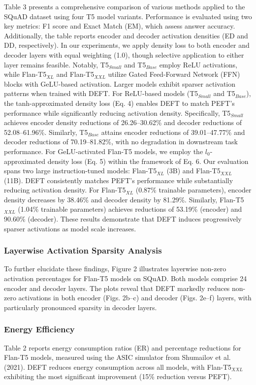 \documentclass[conference]{IEEEtran}
\begin{document}
Table 3 presents a comprehensive comparison of various methods applied to the SQuAD dataset using four T5 model variants. Performance is evaluated using two key metrics: F1 score and Exact Match (EM), which assess answer accuracy. Additionally, the table reports encoder and decoder activation densities (ED and DD, respectively). In our experiments, we apply density loss to both encoder and decoder layers with equal weighting (1.0), though selective application to either layer remains feasible. Notably, T5\(_{Small}\) and T5\(_{Base}\) employ ReLU activations, while Flan-T5\(_{XL}\) and Flan-T5\(_{XXL}\) utilize Gated Feed-Forward Network (FFN) blocks with GeLU-based activation. Larger models exhibit sparser activation patterns when trained with DEFT. For ReLU-based models (T5\(_{Small}\) and T5\(_{Base}\)), the tanh-approximated density loss (Eq. 4) enables DEFT to match PEFT's performance while significantly reducing activation density. Specifically, T5\(_{Small}\) achieves encoder density reductions of 26.26–30.62\% and decoder reductions of 52.08–61.96\%. Similarly, T5\(_{Base}\) attains encoder reductions of 39.01–47.77\% and decoder reductions of 70.19–81.82\%, with no degradation in downstream task performance. For GeLU-activated Flan-T5 models, we employ the \(l_0\)-approximated density loss (Eq. 5) within the framework of Eq. 6. Our evaluation spans two large instruction-tuned models: Flan-T5\(_{XL}\) (3B) and Flan-T5\(_{XXL}\) (11B). DEFT consistently matches PEFT's performance while substantially reducing activation density. For Flan-T5\(_{XL}\) (0.87\% trainable parameters), encoder density decreases by 38.46\% and decoder density by 81.29\%. Similarly, Flan-T5\(_{XXL}\) (1.04\% trainable parameters) achieves reductions of 53.19\% (encoder) and 90.60\% (decoder). These results demonstrate that DEFT induces progressively sparser activations as model scale increases.
\subsubsection*{Layerwise Activation Sparsity Analysis}
To further elucidate these findings, Figure 2 illustrates layerwise non-zero activation percentages for Flan-T5 models on SQuAD. Both models comprise 24 encoder and decoder layers. The plots reveal that DEFT markedly reduces non-zero activations in both encoder (Figs. 2b–c) and decoder (Figs. 2e–f) layers, with particularly pronounced sparsity in decoder layers.
\subsubsection*{Energy Efficiency}
Table 2 reports energy consumption ratios (ER) and percentage reductions for Flan-T5 models, measured using the ASIC simulator from Shumailov et al. (2021). DEFT reduces energy consumption across all models, with Flan-T5\(_{XXL}\) exhibiting the most significant improvement (15\% reduction versus PEFT).
\end{document}
